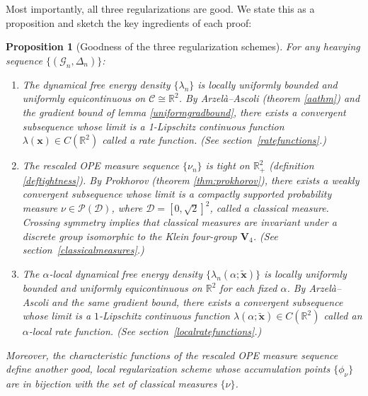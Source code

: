 \documentclass[a4paper,11pt]{article}
\theoremstyle{plain}
\newtheorem{prop}[thm]{Proposition}
\theoremstyle{definition}
\theoremstyle{remark}
\newcommand{\bs}[1]{\boldsymbol{#1}}
\newcommand{\mbf}{\mathbf}
\newcommand{\De}{\Delta}
\begin{document}
Most importantly, all three regularizations are good. We state this as a proposition and sketch the key ingredients of each proof:
\begin{prop}[Goodness of the three regularization schemes]
\label{prop:goodnesspreview}
For any heavying sequence $\{(\mathcal{G}_n, \De_n)\}$:
\begin{enumerate}[label=(\roman*)]
\item The dynamical free energy density $\{\lambda_n\}$ is locally uniformly bounded and uniformly equicontinuous on $\mathscr{C} \cong \mathbb{R}^2$. By Arzel\`a--Ascoli (theorem \ref{aathm}) and the gradient bound of lemma \ref{uniformgradbound}, there exists a convergent subsequence whose limit is a 1-Lipschitz continuous function $\lambda(\bs{x}) \in C(\mathbb{R}^2)$ called a \textit{rate function}. (See section~\ref{ratefunctions}.)
 
\item The rescaled OPE measure sequence $\{\nu_n\}$ is tight on $\mathbb{R}^2_+$ (definition \ref{deftightness}). By Prokhorov (theorem \ref{thm:prokhorov}), there exists a weakly convergent subsequence whose limit is a compactly supported probability measure $\nu \in \mathcal{P}(\mathcal{D})$, where $\mathcal{D} = [0,\sqrt{2}]^2$, called a \textit{classical measure}. Crossing symmetry implies that classical measures are invariant under a discrete group isomorphic to the Klein four-group $\mbf{V}_4$. (See section~\ref{classicalmeasures}.)
 
\item The $\alpha$-local dynamical free energy density $\{\lambda_n(\alpha;\tilde{\bs{x}})\}$ is locally uniformly bounded and uniformly equicontinuous on $ \mathbb{R}^2$ for each fixed $\alpha$. By Arzel\`a--Ascoli and the same gradient bound, there exists a convergent subsequence whose limit is a $1$-Lipschitz continuous function $\lambda(\alpha; \tilde{\bs{x}}) \in C(\mathbb{R}^2)$ called an \textit{$\alpha$-local rate function}. (See section~\ref{localratefunctions}.)
\end{enumerate}
Moreover, the characteristic functions of the rescaled OPE measure sequence define another good, local regularization scheme whose accumulation points $\{\phi_\nu\}$ are in bijection with the set of classical measures $\{\nu\}$.
\end{prop}
 
\end{document}
